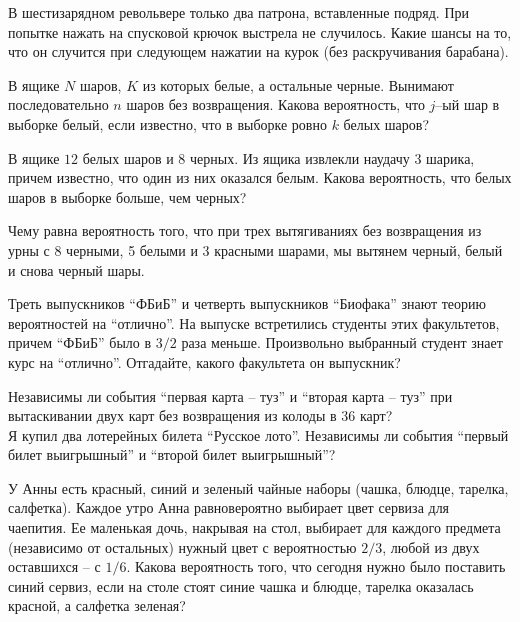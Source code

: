 \begin{problem}
    В шестизарядном револьвере только два патрона, вставленные подряд.
    При попытке нажать на спусковой крючок выстрела не случилось.
    Какие шансы на то, что он случится при следующем нажатии на курок (без раскручивания барабана).
\end{problem}

\begin{problem}
    В ящике $N$ шаров, $K$ из которых белые, а остальные черные.
    Вынимают последовательно $n$ шаров без возвращения.
    Какова вероятность, что $j$–ый шар в выборке белый, если известно, что в выборке ровно $k$ белых шаров?
\end{problem}

\begin{problem}
    В ящике $12$ белых шаров и $8$ черных.
    Из ящика извлекли наудачу $3$ шарика, причем известно, что один из них оказался белым.
    Какова вероятность, что белых шаров в выборке больше, чем черных?
\end{problem}

\begin{problem}
    Чему равна вероятность того, что при трех вытягиваниях без возвращения из урны с 8 черными, 5 белыми и 3 красными шарами, мы вытянем черный, белый и снова черный шары.
\end{problem}

\begin{problem}
    Треть выпускников ``ФБиБ'' и четверть выпускников ``Биофака'' знают теорию вероятностей на ``отлично''.
    На выпуске встретились студенты этих факультетов, причем ``ФБиБ'' было в $ 3 / 2$ раза меньше.
    Произвольно выбранный студент знает курс на ``отлично''.
    Отгадайте, какого факультета он выпускник?
\end{problem}

\begin{problem}
    Независимы ли события ``первая карта -- туз'' и ``вторая карта -- туз'' при вытаскивании двух карт без возвращения из колоды в $36$ карт?\\
    Я купил два лотерейных билета ``Русское лото''.
    Независимы ли события ``первый билет выигрышный'' и ``второй билет выигрышный''?
\end{problem}

\begin{problem}
    У Анны есть красный, синий и зеленый чайные наборы (чашка, блюдце, тарелка, салфетка).
    Каждое утро Анна равновероятно выбирает цвет сервиза для чаепития.
    Ее маленькая дочь, накрывая на стол, выбирает для каждого предмета (независимо от остальных) нужный цвет с вероятностью $2 / 3$, любой из двух оставшихся – с $1 / 6$.
    Какова вероятность того, что сегодня нужно было поставить синий сервиз, если на столе стоят синие чашка и блюдце, тарелка оказалась красной, а салфетка зеленая?
\end{problem}

